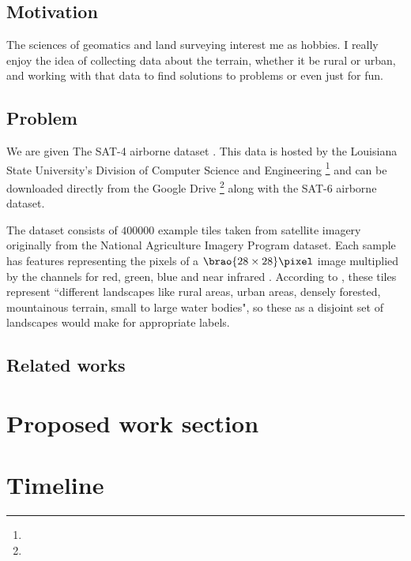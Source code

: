 \documentclass[11pt]{article}
\DeclarePairedDelimiter\brao()%
\begin{document}
\subsection{Motivation}

The sciences of geomatics and land surveying interest me as hobbies.
I really enjoy the idea of collecting data about the terrain,
whether it be rural or urban,
and working with that data to find solutions to problems
or even just for fun.

\subsection{Problem}

We are given
The SAT-4 airborne dataset%
\cite{Basu2015a}.
This data is hosted by the Louisiana State University's Division of Computer Science and Engineering%
\footnote{%
}
and can be downloaded directly from the Google Drive%
\footnote{%
}
along with the SAT-6 airborne dataset.

The dataset consists of \(\num{400000}\) example tiles
taken from satellite imagery originally from the National Agriculture Imagery Program  dataset.
Each sample has features representing the pixels of a \(\SI[parse-numbers=false]{\brao{28\times28}\!}\pixel\) image 
multiplied by the channels for red, green, blue and near infrared .
According to \textcite{Basu2015a},
these tiles represent ``different landscapes like rural areas, urban areas, densely forested, mountainous terrain, small to large water bodies",
so these as a disjoint set of landscapes would make for appropriate labels.

\subsection{Related works}

\section{Proposed work section}
\section{Timeline}

\printbibliography
\end{document}
